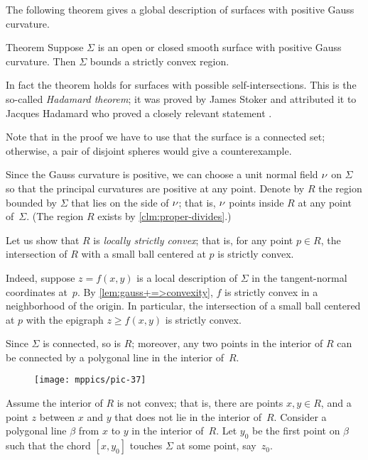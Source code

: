 The following theorem gives a global description of surfaces with positive Gauss curvature.

\begin{thm}{Theorem}\label{thm:convex-embedded}
Suppose $\Sigma$ is an open or closed smooth surface with positive Gauss curvature.
Then $\Sigma$ bounds a strictly convex region.
\end{thm}

In fact the theorem holds for surfaces with possible self-intersections. 
This is the so-called {}\emph{Hadamard theorem};
it was proved by James Stoker \cite{stoker} and attributed it to Jacques Hadamard who proved a closely relevant statement \cite[item 23]{hadamard}.

Note that in the proof we have to use that the surface is a connected set;
otherwise, a pair of disjoint spheres would give a counterexample.

Since the Gauss curvature is positive, we can choose a unit normal field $\nu$ on $\Sigma$ so that the principal curvatures are positive at any point.
Denote by $R$ the region bounded by $\Sigma$ that lies on the side of $\nu$;
that is, $\nu$ points inside $R$ at any point of~$\Sigma$.
(The region $R$ exists by \ref{clm:proper-divides}.)

Let us show that $R$ is {}\emph{locally strictly convex};
that is, for any point $p\in R$, the intersection of $R$ with a small ball centered at $p$ is strictly convex.

Indeed, suppose $z=f(x,y)$ is a local description of $\Sigma$ in the tangent-normal coordinates at~$p$.
By \ref{lem:gauss+=>convexity}, $f$ is strictly convex in a neighborhood of the origin.
In particular, the intersection of a small ball centered at $p$ with the epigraph $z\ge f(x,y)$ is strictly convex.

Since $\Sigma$ is connected, so is $R$;
moreover, any two points in the interior of $R$ can be connected by a polygonal line in the interior of~$R$.

\begin{wrapfigure}{o}{43 mm}
\vskip-0mm
\centering
\texttt{[image: mppics/pic-37]}
\vskip-0mm
\end{wrapfigure}

Assume the interior of $R$ is not convex;
that is, there are points $x,y\in R$, and a point $z$ between $x$ and $y$ that does not lie in the interior of~$R$.
Consider a polygonal  line $\beta$ from $x$ to $y$ in the interior of~$R$.
Let $y_0$ be the first point on $\beta$ such that the chord $[x,y_0]$ touches $\Sigma$ at some point, say~$z_0$.

